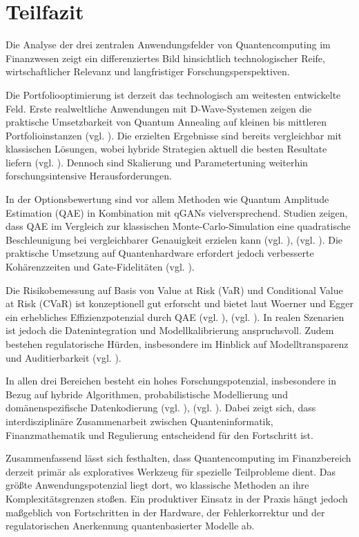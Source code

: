 \section{Teilfazit}

Die Analyse der drei zentralen Anwendungsfelder von Quantencomputing im Finanzwesen zeigt ein differenziertes Bild hinsichtlich technologischer Reife, wirtschaftlicher Relevanz und langfristiger Forschungsperspektiven.

Die Portfoliooptimierung ist derzeit das technologisch am weitesten entwickelte Feld. Erste realweltliche Anwendungen mit D-Wave-Systemen zeigen die praktische Umsetzbarkeit von Quantum Annealing auf kleinen bis mittleren Portfolioinstanzen (vgl. \cite{sakuler_real-world_2025}). Die erzielten Ergebnisse sind bereits vergleichbar mit klassischen Lösungen, wobei hybride Strategien aktuell die besten Resultate liefern (vgl. \cite{sakuler_real-world_2025}). Dennoch sind Skalierung und Parametertuning weiterhin forschungsintensive Herausforderungen.

In der Optionsbewertung sind vor allem Methoden wie Quantum Amplitude Estimation (QAE) in Kombination mit qGANs vielversprechend. Studien zeigen, dass QAE im Vergleich zur klassischen Monte-Carlo-Simulation eine quadratische Beschleunigung bei vergleichbarer Genauigkeit erzielen kann (vgl. \cite{zoufal_quantum_2019}), (vgl. \cite{stamatopoulos_option_2020}). Die praktische Umsetzung auf Quantenhardware erfordert jedoch verbesserte Kohärenzzeiten und Gate-Fidelitäten (vgl. \cite{zoufal_quantum_2019}).

Die Risikobemessung auf Basis von Value at Risk (VaR) und Conditional Value at Risk (CVaR) ist konzeptionell gut erforscht und bietet laut Woerner und Egger ein erhebliches Effizienzpotenzial durch QAE (vgl. \cite{orus_quantum_2019}), (vgl. \cite{zhou_quantum_2025}). In realen Szenarien ist jedoch die Datenintegration und Modellkalibrierung anspruchsvoll. Zudem bestehen regulatorische Hürden, insbesondere im Hinblick auf Modelltransparenz und Auditierbarkeit (vgl. \cite{egger_quantum_2020}).

In allen drei Bereichen besteht ein hohes Forschungspotenzial, insbesondere in Bezug auf hybride Algorithmen, probabilistische Modellierung und domänenspezifische Datenkodierung (vgl. \cite{zoufal_quantum_2019}), (vgl. \cite{zhou_quantum_2025}). Dabei zeigt sich, dass interdisziplinäre Zusammenarbeit zwischen Quanteninformatik, Finanzmathematik und Regulierung entscheidend für den Fortschritt ist.

Zusammenfassend lässt sich festhalten, dass Quantencomputing im Finanzbereich derzeit primär als exploratives Werkzeug für spezielle Teilprobleme dient. Das größte Anwendungspotenzial liegt dort, wo klassische Methoden an ihre Komplexitätsgrenzen stoßen. Ein produktiver Einsatz in der Praxis hängt jedoch maßgeblich von Fortschritten in der Hardware, der Fehlerkorrektur und der regulatorischen Anerkennung quantenbasierter Modelle ab.





\printbibliography





